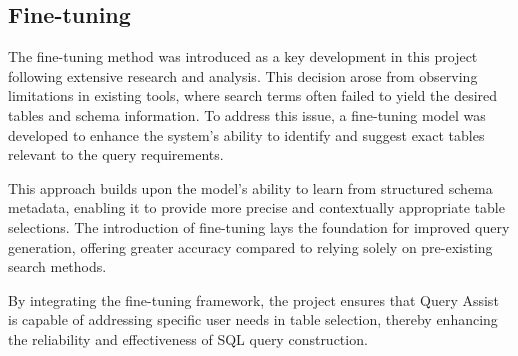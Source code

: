     \subsection{Fine-tuning}
    The fine-tuning method was introduced as a key development in this project following extensive research and analysis. This decision arose from observing limitations in existing tools, where search terms often failed to yield the desired tables and schema information. To address this issue, a fine-tuning model was developed to enhance the system’s ability to identify and suggest exact tables relevant to the query requirements.

    This approach builds upon the model's ability to learn from structured schema metadata, enabling it to provide more precise and contextually appropriate table selections. The introduction of fine-tuning lays the foundation for improved query generation, offering greater accuracy compared to relying solely on pre-existing search methods.

    By integrating the fine-tuning framework, the project ensures that Query Assist is capable of addressing specific user needs in table selection, thereby enhancing the reliability and effectiveness of SQL query construction.






